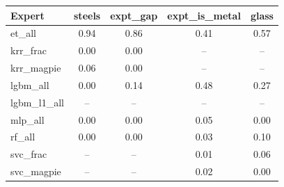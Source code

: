 \begin{tabular}{lcccc}
\toprule
Expert & steels & expt\_gap & expt\_is\_metal & glass \\
\midrule
et\_all & 0.94 & 0.86 & 0.41 & 0.57 \\
krr\_frac & 0.00 & 0.00 & -- & -- \\
krr\_magpie & 0.06 & 0.00 & -- & -- \\
lgbm\_all & 0.00 & 0.14 & 0.48 & 0.27 \\
lgbm\_l1\_all & -- & -- & -- & -- \\
mlp\_all & 0.00 & 0.00 & 0.05 & 0.00 \\
rf\_all & 0.00 & 0.00 & 0.03 & 0.10 \\
svc\_frac & -- & -- & 0.01 & 0.06 \\
svc\_magpie & -- & -- & 0.02 & 0.00 \\
\bottomrule
\end{tabular}
